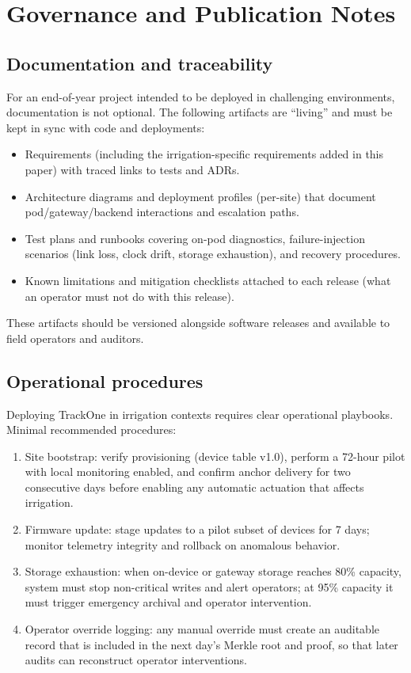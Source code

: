 \section{Governance and Publication Notes}
\label{sec:governance-notes}

\subsection{Documentation and traceability}\label{subsec:documentation-and-traceability}
For an end-of-year project intended to be deployed in challenging environments, documentation is not optional.
The following artifacts are ``living'' and must be kept in sync with code and deployments:
\begin{itemize}[nosep]
  \item Requirements (including the irrigation-specific requirements added in this paper) with traced links to tests and \ac{ADR}s.
  \item Architecture diagrams and deployment profiles (per-site) that document pod/gateway/backend interactions and escalation paths.
  \item Test plans and runbooks covering on-pod diagnostics, failure-injection scenarios (link loss, clock drift, storage exhaustion), and recovery procedures.
  \item Known limitations and mitigation checklists attached to each release (what an operator must not do with this release).
\end{itemize}

These artifacts should be versioned alongside software releases and available to field operators and auditors.

\subsection{Operational procedures}\label{subsec:operational-procedures}
Deploying TrackOne in irrigation contexts requires clear operational playbooks.
Minimal recommended procedures:
\begin{enumerate}[nosep]
  \item Site bootstrap: verify provisioning (device table v1.0), perform a 72-hour pilot with local monitoring enabled, and confirm anchor delivery for two consecutive days before enabling any automatic actuation that affects irrigation.
  \item Firmware update: stage updates to a pilot subset of devices for 7 days; monitor telemetry integrity and rollback on anomalous behavior.
  \item Storage exhaustion: when on-device or gateway storage reaches 80\% capacity, system must stop non-critical writes and alert operators; at 95\% capacity it must trigger emergency archival and operator intervention.
  \item Operator override logging: any manual override must create an auditable record that is included in the next day's Merkle root and proof, so that later audits can reconstruct operator interventions.
\end{enumerate}

